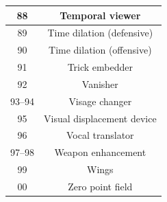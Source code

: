 \begin{longtable}{| c | c |}
88 & Temporal viewer \\ \hline
89 & Time dilation (defensive) \\ \hline
90 & Time dilation (offensive) \\ \hline
91 & Trick embedder \\ \hline
92 & Vanisher \\ \hline
93–94 & Visage changer \\ \hline
95 & Visual displacement device \\ \hline
96 & Vocal translator \\ \hline
97–98 & Weapon enhancement \\ \hline
99 & Wings \\ \hline
00 & Zero point field \\ \hline

\end{longtable}

